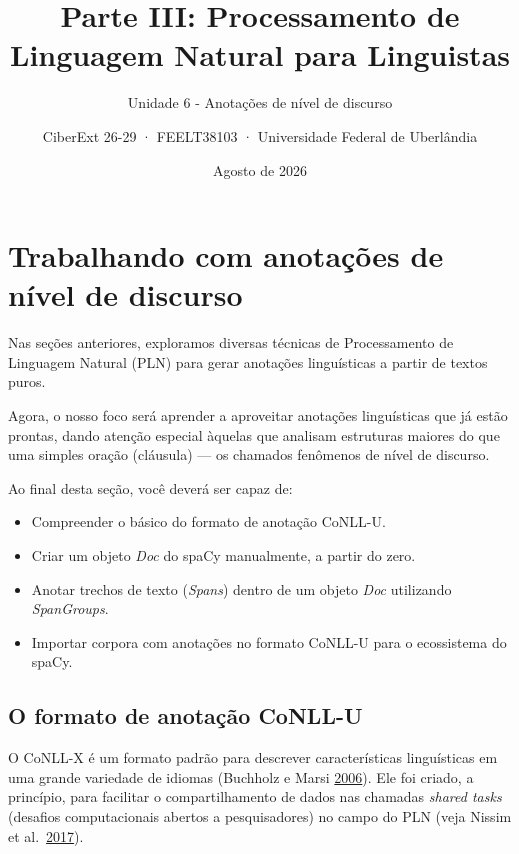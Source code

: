 \documentclass[
  brazilian,
]{article}
\title{Parte III: Processamento de Linguagem Natural para Linguistas}
\subtitle{Unidade 6 - Anotações de nível de discurso}
\author{CiberExt 26-29 · FEELT38103 · Universidade Federal de
Uberlândia}
\date{Agosto de 2026}
\providecommand{\tightlist}{%
  \setlength{\itemsep}{0pt}\setlength{\parskip}{0pt}}
\begin{document}
\maketitle

\hypertarget{trabalhando-com-anotauxe7uxf5es-de-nuxedvel-de-discurso}{%
\section{Trabalhando com anotações de nível de
discurso}\label{trabalhando-com-anotauxe7uxf5es-de-nuxedvel-de-discurso}}

Nas seções anteriores, exploramos diversas técnicas de Processamento de
Linguagem Natural (PLN) para gerar anotações linguísticas a partir de
textos puros.

Agora, o nosso foco será aprender a aproveitar anotações linguísticas
que já estão prontas, dando atenção especial àquelas que analisam
estruturas maiores do que uma simples oração (cláusula) --- os chamados
fenômenos de nível de discurso.

Ao final desta seção, você deverá ser capaz de:

\begin{itemize}
\tightlist
\item
  Compreender o básico do formato de anotação CoNLL-U.
\item
  Criar um objeto \emph{Doc} do spaCy manualmente, a partir do zero.
\item
  Anotar trechos de texto (\emph{Spans}) dentro de um objeto \emph{Doc}
  utilizando \emph{SpanGroups}.
\item
  Importar corpora com anotações no formato CoNLL-U para o ecossistema
  do spaCy.
\end{itemize}

\hypertarget{o-formato-de-anotauxe7uxe3o-conll-u}{%
\subsection{O formato de anotação
CoNLL-U}\label{o-formato-de-anotauxe7uxe3o-conll-u}}

O CoNLL-X é um formato padrão para descrever características
linguísticas em uma grande variedade de idiomas (Buchholz e Marsi
\href{https://www.aclweb.org/anthology/W06-2920}{2006}). Ele foi criado,
a princípio, para facilitar o compartilhamento de dados nas chamadas
\emph{shared tasks} (desafios computacionais abertos a pesquisadores) no
campo do PLN (veja Nissim et
al.~\href{https://doi.org/10.1162/COLI_a_00304}{2017}).
\end{document}
